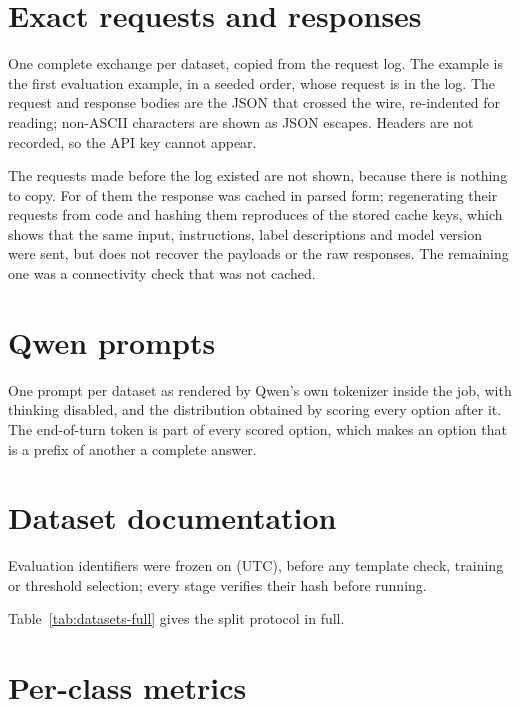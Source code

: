 \section{Exact requests and responses}
\label{app:payloads}

One complete exchange per dataset, copied from the request log. The example is the first
evaluation example, in a seeded order, whose request is in the log. The request and response
bodies are the JSON that crossed the wire, re-indented for reading; non-ASCII characters are shown
as JSON escapes. Headers are not recorded, so the API key cannot appear.

The \AuditUnlogged{} requests made before the log existed are not shown, because there is nothing
to copy. For \AuditUnloggedCached{} of them the response was cached in parsed form; regenerating
their requests from code and hashing them reproduces \AuditRegeneratedMatches{} of the
\AuditUnloggedCached{} stored cache keys, which shows that the same input, instructions, label
descriptions and model version were sent, but does not recover the payloads or the raw responses.
The remaining one was a connectivity check that was not cached.



\section{Qwen prompts}
\label{app:qwen}

One prompt per dataset as rendered by Qwen's own tokenizer inside the job, with thinking
disabled, and the distribution obtained by scoring every option after it. The end-of-turn token
is part of every scored option, which makes an option that is a prefix of another a complete
answer.



\section{Dataset documentation}
\label{app:datasets}

Evaluation identifiers were frozen on \FrozenAt{} (UTC), before any template check, training or
threshold selection; every stage verifies their hash before running.

\begin{table}[H]
  \caption{Datasets and split protocol. ``Jev requests'' is the number of examples Jev predicts:
    every row of the tabular datasets (each repeat's validation and test parts both use its
    predictions), and the held-out split of the text datasets plus, for SST-2, \NJevValSst{}
    validation items for threshold selection.}
  \label{tab:datasets-full}
  \centering\small
  \fittable{}
\end{table}

Table~\ref{tab:datasets-full} gives the split protocol in full.



\section{Per-class metrics}
\label{app:perclass}


